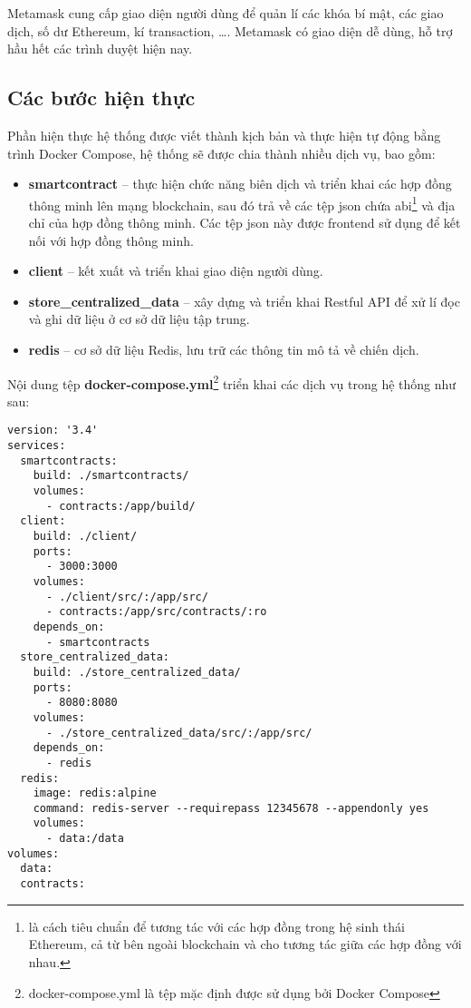 \documentclass[../main-report.tex]{subfiles}
\begin{document}
Metamask cung cấp giao diện người dùng để quản lí các khóa bí mật, các giao dịch, số dư Ethereum, kí transaction, \ldots. Metamask có giao diện dễ dùng, hỗ trợ hầu hết các trình duyệt hiện nay.
\subsection{Các bước hiện thực}
Phần hiện thực hệ thống được viết thành kịch bản và thực hiện tự động bằng trình Docker Compose, hệ thống sẽ được chia thành nhiều dịch vụ, bao gồm:

\begin{itemize}
\item \textbf{smartcontract} -- thực hiện chức năng biên dịch và triển khai các hợp đồng thông minh lên mạng blockchain, sau đó trả về các tệp json chứa \acrfull{abi}\footnote{là cách tiêu chuẩn để tương tác với các hợp đồng trong hệ sinh thái Ethereum, cả từ bên ngoài blockchain và cho tương tác giữa các hợp đồng với nhau.} và địa chỉ của hợp đồng thông minh. Các tệp json này được \gls{frontend} sử dụng để kết nối với hợp đồng thông minh.
\item \textbf{client} -- kết xuất và triển khai giao diện người dùng.
\item \textbf{store\_centralized\_data} -- xây dựng và triển khai Restful API để xử lí đọc và ghi dữ liệu ở cơ sở dữ liệu tập trung.
\item \textbf{redis} -- cơ sở dữ liệu Redis, lưu trữ các thông tin mô tả về chiến dịch.
\end{itemize}

Nội dung tệp \textbf{docker-compose.yml}\footnote{docker-compose.yml là tệp mặc định được sử dụng bởi Docker Compose} triển khai các dịch vụ trong hệ thống như sau:

\begin{lstlisting}
version: '3.4'
services:
  smartcontracts:
    build: ./smartcontracts/
    volumes:
      - contracts:/app/build/
  client:
    build: ./client/
    ports:
      - 3000:3000
    volumes:
      - ./client/src/:/app/src/
      - contracts:/app/src/contracts/:ro
    depends_on:
      - smartcontracts
  store_centralized_data:
    build: ./store_centralized_data/
    ports:
      - 8080:8080
    volumes:
      - ./store_centralized_data/src/:/app/src/
    depends_on:
      - redis
  redis:
    image: redis:alpine
    command: redis-server --requirepass 12345678 --appendonly yes
    volumes:
      - data:/data
volumes:
  data:
  contracts:
\end{lstlisting}
\end{document}
